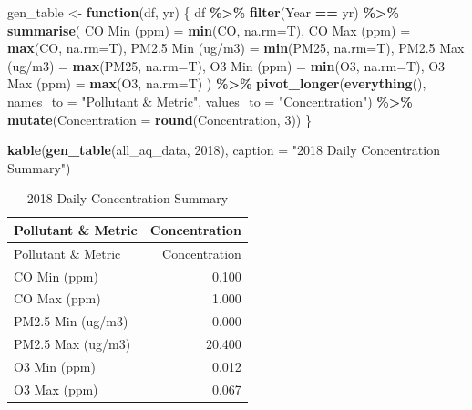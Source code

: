 \documentclass[
]{article}
\newenvironment{Shaded}{\begin{snugshade}}{\end{snugshade}}
\newcommand{\AttributeTok}[1]{\textcolor[rgb]{0.13,0.29,0.53}{#1}}
\newcommand{\ControlFlowTok}[1]{\textcolor[rgb]{0.13,0.29,0.53}{\textbf{#1}}}
\newcommand{\DecValTok}[1]{\textcolor[rgb]{0.00,0.00,0.81}{#1}}
\newcommand{\FunctionTok}[1]{\textcolor[rgb]{0.13,0.29,0.53}{\textbf{#1}}}
\newcommand{\NormalTok}[1]{#1}
\newcommand{\OtherTok}[1]{\textcolor[rgb]{0.56,0.35,0.01}{#1}}
\newcommand{\SpecialCharTok}[1]{\textcolor[rgb]{0.81,0.36,0.00}{\textbf{#1}}}
\newcommand{\StringTok}[1]{\textcolor[rgb]{0.31,0.60,0.02}{#1}}
\begin{document}
\begin{Shaded}
\begin{Highlighting}[]
\NormalTok{gen\_table }\OtherTok{\textless{}{-}} \ControlFlowTok{function}\NormalTok{(df, yr) \{}
\NormalTok{  df }\SpecialCharTok{\%\textgreater{}\%} \FunctionTok{filter}\NormalTok{(Year }\SpecialCharTok{==}\NormalTok{ yr) }\SpecialCharTok{\%\textgreater{}\%}
    \FunctionTok{summarise}\NormalTok{(}
      \StringTok{\textasciigrave{}}\AttributeTok{CO Min (ppm)}\StringTok{\textasciigrave{}} \OtherTok{=} \FunctionTok{min}\NormalTok{(CO, }\AttributeTok{na.rm=}\NormalTok{T), }\StringTok{\textasciigrave{}}\AttributeTok{CO Max (ppm)}\StringTok{\textasciigrave{}} \OtherTok{=} \FunctionTok{max}\NormalTok{(CO, }\AttributeTok{na.rm=}\NormalTok{T),}
      \StringTok{\textasciigrave{}}\AttributeTok{PM2.5 Min (ug/m3)}\StringTok{\textasciigrave{}} \OtherTok{=} \FunctionTok{min}\NormalTok{(PM25, }\AttributeTok{na.rm=}\NormalTok{T), }\StringTok{\textasciigrave{}}\AttributeTok{PM2.5 Max (ug/m3)}\StringTok{\textasciigrave{}} \OtherTok{=} \FunctionTok{max}\NormalTok{(PM25, }\AttributeTok{na.rm=}\NormalTok{T),}
      \StringTok{\textasciigrave{}}\AttributeTok{O3 Min (ppm)}\StringTok{\textasciigrave{}} \OtherTok{=} \FunctionTok{min}\NormalTok{(O3, }\AttributeTok{na.rm=}\NormalTok{T), }\StringTok{\textasciigrave{}}\AttributeTok{O3 Max (ppm)}\StringTok{\textasciigrave{}} \OtherTok{=} \FunctionTok{max}\NormalTok{(O3, }\AttributeTok{na.rm=}\NormalTok{T)}
\NormalTok{    ) }\SpecialCharTok{\%\textgreater{}\%} \FunctionTok{pivot\_longer}\NormalTok{(}\FunctionTok{everything}\NormalTok{(), }\AttributeTok{names\_to =} \StringTok{"Pollutant \& Metric"}\NormalTok{, }\AttributeTok{values\_to =} \StringTok{"Concentration"}\NormalTok{) }\SpecialCharTok{\%\textgreater{}\%}
    \FunctionTok{mutate}\NormalTok{(}\AttributeTok{Concentration =} \FunctionTok{round}\NormalTok{(Concentration, }\DecValTok{3}\NormalTok{))}
\NormalTok{\}}

\FunctionTok{kable}\NormalTok{(}\FunctionTok{gen\_table}\NormalTok{(all\_aq\_data, }\DecValTok{2018}\NormalTok{), }\AttributeTok{caption =} \StringTok{"2018 Daily Concentration Summary"}\NormalTok{)}
\end{Highlighting}
\end{Shaded}

\begin{longtable}[]{@{}lr@{}}
\caption{2018 Daily Concentration Summary}\tabularnewline
\toprule\noalign{}
Pollutant \& Metric & Concentration \\
\midrule\noalign{}
\endfirsthead
\toprule\noalign{}
Pollutant \& Metric & Concentration \\
\midrule\noalign{}
\endhead
\bottomrule\noalign{}
\endlastfoot
CO Min (ppm) & 0.100 \\
CO Max (ppm) & 1.000 \\
PM2.5 Min (ug/m3) & 0.000 \\
PM2.5 Max (ug/m3) & 20.400 \\
O3 Min (ppm) & 0.012 \\
O3 Max (ppm) & 0.067 \\
\end{longtable}
\end{document}
